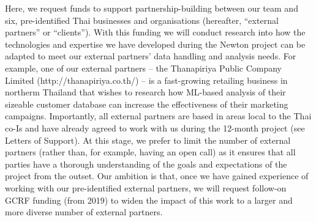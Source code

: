 \documentclass[11pt]{article}
\begin{document}
\vspace{2mm}
\noindent
Here, we request funds to support partnership-building between our team and six, pre-identified Thai businesses and organisations (hereafter, ``external partners'' or ``clients''). With this funding we will conduct research into how the technologies and expertise we have developed during the Newton project can be adapted to meet our external partners' data handling and analysis needs. For example, one of our external partners -- the Thanapiriya Public Company Limited (http://thanapiriya.co.th/) -- is a fast-growing retailing business in northerm Thailand that wishes to research how ML-based analysis of their sizeable customer database can increase the effectiveness of their marketing campaigns. Importantly, all external partners are based in areas local to the Thai co-Is and have already agreed to work with us during the 12-month project (see Letters of Support). At this stage, we prefer to limit the number of external partners (rather than, for example, having an open call) as it ensures that all parties have a thorough understanding of the goals and expectations of the project from the outset. Our ambition is that, once we have gained experience of working with our pre-identified external partners, we will request follow-on GCRF funding (from 2019) to widen the impact of this work to a larger and more diverse number of external partners.
\end{document}
